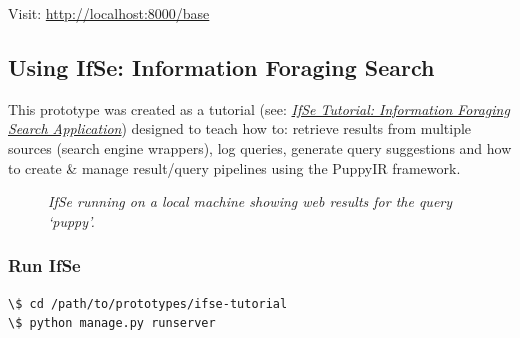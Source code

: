 \documentclass[letterpaper,10pt,english]{sphinxmanual}
\begin{document}
Visit: \href{http://localhost:8000/base}{http://localhost:8000/base}


\subsection{Using IfSe: Information Foraging Search}
\label{prototypes:using-ifse-information-foraging-search}
This prototype was created as a tutorial (see: {\hyperref[ifse-tutorial:information-foraging-puppyir-tutorial]{\emph{IfSe Tutorial: Information Foraging Search Application}}}) designed to teach how to: retrieve results from multiple sources (search engine wrappers), log queries, generate query suggestions and how to create \& manage result/query pipelines using the PuppyIR framework.
\begin{figure}[htbp]
\centering
\capstart

\caption{\emph{IfSe running on a local machine showing web results for the query `puppy'.}}\end{figure}


\subsubsection{Run IfSe}
\label{prototypes:run-ifse}
\begin{Verbatim}[commandchars=\\\{\}]
\$ cd /path/to/prototypes/ifse-tutorial
\$ python manage.py runserver
\end{Verbatim}
\end{document}

